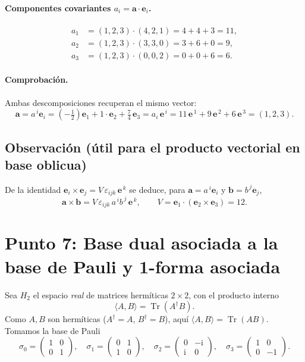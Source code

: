 \documentclass[12pt]{article}
\newcommand{\e}{\mathbf e}   %
\newcommand{\Tr}{\operatorname{Tr}}
\newcommand{\I}{\mathrm{i}} %
\begin{document}
\paragraph{Componentes covariantes $a_i=\mathbf a\cdot \e_i$.}
\[
\begin{aligned}
a_1&=(1,2,3)\cdot(4,2,1)=4+4+3=11,\\
a_2&=(1,2,3)\cdot(3,3,0)=3+6+0=9,\\
a_3&=(1,2,3)\cdot(0,0,2)=0+0+6=6.
\end{aligned}
\]

\paragraph{Comprobación.}
Ambas descomposiciones recuperan el mismo vector:
\[
\mathbf a
= a^{\,i}\e_i=(-\tfrac12)\e_1+1\cdot \e_2+\tfrac74\,\e_3
= a_i\,\e^{\,i}=11\,\e^{\,1}+9\,\e^{\,2}+6\,\e^{\,3}
=(1,2,3).
\]

\subsection*{Observación (útil para el producto vectorial en base oblicua)}
De la identidad
\(
\e_i\times \e_j=V\,\varepsilon_{ijk}\,\e^{\,k}
\)
se deduce, para $\mathbf a=a^{\,i}\e_i$ y $\mathbf b=b^{\,j}\e_j$,
\[
\boxed{\quad
\mathbf a\times \mathbf b
=V\,\varepsilon_{ijk}\,a^{\,i}b^{\,j}\,\e^{\,k},
\qquad V=\e_1\cdot(\e_2\times \e_3)=12.
\quad}
\]

\section*{Punto 7: Base dual asociada a la base de Pauli y 1-forma asociada}

Sea $H_2$ el espacio \emph{real} de matrices herm\'iticas $2\times 2$, con el producto interno
\[
\langle A,B\rangle=\Tr(A^\dagger B).
\]
Como $A,B$ son herm\'iticas ($A^\dagger=A$, $B^\dagger=B$), aqu\'i $\langle A,B\rangle=\Tr(AB)$.
Tomamos la base de Pauli
\[
\sigma_0=\begin{pmatrix}1&0\\[2pt]0&1\end{pmatrix},\quad
\sigma_1=\begin{pmatrix}0&1\\[2pt]1&0\end{pmatrix},\quad
\sigma_2=\begin{pmatrix}0&-\I\\[2pt]\I&0\end{pmatrix},\quad
\sigma_3=\begin{pmatrix}1&0\\[2pt]0&-1\end{pmatrix}.
\]
\end{document}
